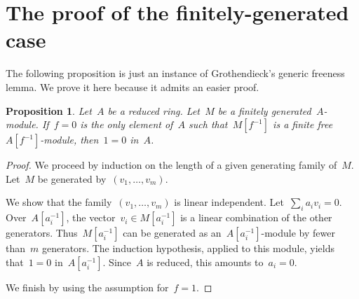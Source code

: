 \documentclass{amsart}
\theoremstyle{definition}
\theoremstyle{plain}
\newtheorem{prop}[defn]{Proposition}
\theoremstyle{remark}
\begin{document}
\section{The proof of the finitely-generated case}

The following proposition is just an instance of Grothendieck's generic
freeness lemma. We prove it here because it admits an easier proof.

\begin{prop}Let~$A$ be a reduced ring. Let~$M$ be a finitely
generated~$A$-module. If~$f = 0$ is the only element of~$A$ such
that~$M[f^{-1}]$ is a finite free~$A[f^{-1}]$-module, then~$1 = 0$ in~$A$.
\end{prop}

\begin{proof}We proceed by induction on the length of a given generating family
of~$M$. Let~$M$ be generated by~$(v_1,\ldots,v_m)$.

We show that the family~$(v_1,\ldots,v_m)$ is linear independent. Let~$\sum_i
a_i v_i = 0$. Over~$A[a_i^{-1}]$, the vector~$v_i \in M[a_i^{-1}]$ is a linear
combination of the other generators. Thus~$M[a_i^{-1}]$ can be generated as
an~$A[a_i^{-1}]$-module by fewer than~$m$ generators. The induction hypothesis,
applied to this module, yields that~$1 = 0$ in~$A[a_i^{-1}]$. Since~$A$ is
reduced, this amounts to~$a_i = 0$.

We finish by using the assumption for~$f = 1$.
\end{proof}
\end{document}

